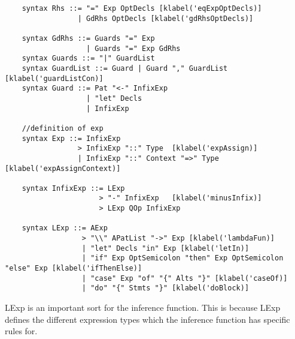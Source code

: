\begin{lstlisting}
    syntax Rhs ::= "=" Exp OptDecls [klabel('eqExpOptDecls)]
                 | GdRhs OptDecls [klabel('gdRhsOptDecls)]

    syntax GdRhs ::= Guards "=" Exp
                   | Guards "=" Exp GdRhs
    syntax Guards ::= "|" GuardList
    syntax GuardList ::= Guard | Guard "," GuardList  [klabel('guardListCon)]
    syntax Guard ::= Pat "<-" InfixExp
                   | "let" Decls
                   | InfixExp

    //definition of exp
    syntax Exp ::= InfixExp
                 > InfixExp "::" Type  [klabel('expAssign)]
                 | InfixExp "::" Context "=>" Type  [klabel('expAssignContext)]

    syntax InfixExp ::= LExp
                      > "-" InfixExp   [klabel('minusInfix)]
                      > LExp QOp InfixExp

    syntax LExp ::= AExp
                  > "\\" APatList "->" Exp [klabel('lambdaFun)]
                  | "let" Decls "in" Exp [klabel('letIn)]
                  | "if" Exp OptSemicolon "then" Exp OptSemicolon "else" Exp [klabel('ifThenElse)]
                  | "case" Exp "of" "{" Alts "}" [klabel('caseOf)]
                  | "do" "{" Stmts "}" [klabel('doBlock)]

\end{lstlisting}

LExp is an important sort for the inference function. This is because LExp defines the different expression types which the inference function has specific rules for.

